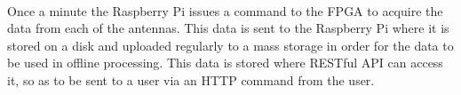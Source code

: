 \\

Once a minute the Raspberry Pi issues a command to the FPGA to acquire the data from each of the antennas. This data is sent to the Raspberry Pi where it is stored on a disk and uploaded regularly to a mass storage in order for the data to be used in offline processing.\cite{CALIBRATION_AND_SYNTHESIS_TART} This data is stored where RESTful API can access it, so as to be sent to a user via an HTTP command from the user.
